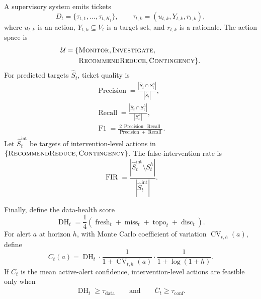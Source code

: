 A supervisory system emits tickets
\begin{equation}
D_t=\{\tau_{t,1},\ldots,\tau_{t,K_t}\},
\qquad
\tau_{t,k}=(u_{t,k},Y_{t,k},r_{t,k}),
\end{equation}
where $u_{t,k}$ is an action, $Y_{t,k}\subseteq V_t$ is a target set, and $r_{t,k}$ is a rationale. The action space is
\begin{align*}
\mathcal{U}
=
\{&
\textsc{Monitor},
\textsc{Investigate},\\
&\textsc{RecommendReduce},
\textsc{Contingency}
\}.
\end{align*}
For predicted targets $\widehat{S}_t$, ticket quality is
\begin{gather*}
\operatorname{Precision}
=
\frac{|\widehat{S}_t\cap S_t^h|}{|\widehat{S}_t|},\\
\operatorname{Recall}
=
\frac{|\widehat{S}_t\cap S_t^h|}{|S_t^h|},\\
\operatorname{F1}
=
\frac{
2\,\operatorname{Precision}\,\operatorname{Recall}
}{
\operatorname{Precision}+\operatorname{Recall}
}.
\end{gather*}
Let $\widehat{S}^{\mathrm{int}}_t$ be targets of intervention-level actions in $\{\textsc{RecommendReduce},\textsc{Contingency}\}$. The false-intervention rate is
\begin{equation}
\operatorname{FIR}
=
\frac{
|\widehat{S}^{\mathrm{int}}_t\setminus S_t^h|
}{
|\widehat{S}^{\mathrm{int}}_t|
}.
\end{equation}

Finally, define the data-health score
\begin{equation}
\operatorname{DH}_t
=
\frac{1}{4}
\left(
\operatorname{fresh}_t+
\operatorname{miss}_t+
\operatorname{topo}_t+
\operatorname{disc}_t
\right).
\end{equation}
For alert $a$ at horizon $h$, with Monte Carlo coefficient of variation $\operatorname{CV}_{t,h}(a)$, define
\begin{equation}
C_t(a)
=
\operatorname{DH}_t
\cdot
\frac{1}{1+\operatorname{CV}_{t,h}(a)}
\cdot
\frac{1}{1+\log(1+h)}.
\end{equation}
If $\bar{C}_t$ is the mean active-alert confidence, intervention-level actions are feasible only when
\begin{equation}
\operatorname{DH}_t\geq\tau_{\mathrm{data}}
\qquad\text{and}\qquad
\bar{C}_t\geq\tau_{\mathrm{conf}}.
\end{equation}
